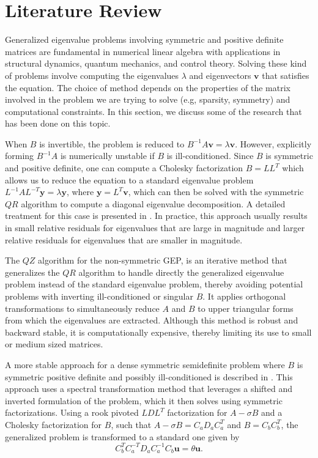\section{Literature Review}\label{sec:LiteratureReview}
Generalized eigenvalue problems involving symmetric and positive definite matrices are fundamental in numerical linear algebra with applications in structural  dynamics, quantum mechanics, and control theory. Solving these kind of problems involve computing the eigenvalues $\lambda$ and eigenvectors $\mathbf{v}$ that satisfies the equation. The choice of method depends on the properties of the matrix involved in the problem we are trying to solve (e.g, sparsity, symmetry) and computational constraints. In this section, we discuss some of the research that has been done on this topic.

When $B$ is invertible, the problem is reduced to $B^{-1}A\mathbf{v} = \lambda \mathbf{v}$. However, explicitly forming $B^{-1}A$ is numerically unstable if $B$ is ill-conditioned. Since $B$ is symmetric and positive definite, one can compute a Cholesky factorization $B = LL^{T}$ which allows us to reduce the equation to a standard eigenvalue problem $L^{-1}AL^{-T}\mathbf{y} = \lambda \mathbf{y}$, where $\mathbf{y}= L^T \mathbf{v}$, which can then be solved with the symmetric $QR$ algorithm to compute a diagonal eigenvalue decomposition. A detailed treatment for this case is presented in \cite{doi:10.1137/1.9781421407944}. In practice, this approach usually results in small relative residuals for eigenvalues that are large in magnitude and larger relative residuals for eigenvalues that are smaller in magnitude.

The $QZ$ algorithm \cite{5b3d5fb1-4813-3046-9331-a730b392f611} for the non-symmetric GEP, is an iterative method that generalizes the $QR$ algorithm to handle directly the generalized eigenvalue problem instead of the standard eigenvalue problem, thereby avoiding potential problems with inverting ill-conditioned or singular $B$. It applies orthogonal transformations to simultaneously reduce $A$ and $B$ to upper triangular forms from which the eigenvalues are extracted. Although this method is robust and backward stable, it is computationally expensive, thereby limiting its use to small or medium sized matrices.

A more stable approach for a dense symmetric semidefinite problem where $B$ is symmetric positive definite and possibly ill-conditioned is described in \cite{stewart2024spectraltransformationdensesymmetric}. This approach uses a spectral transformation method that leverages a shifted and inverted formulation of the problem, which it then solves using symmetric factorizations. Using a rook pivoted $LDL^T$ factorization for $A-\sigma B$ and a Cholesky factorization for $B$, such that $A-\sigma B = C_aD_aC_a^T$ and $B = C_bC_b^T$, the generalized problem is transformed to a standard one given by
\begin{equation}\label{eq:SpectralTrans_With_LDL}
	C_b^TC_a^{-T}D_aC_a^{-1}C_b \mathbf{u} = \theta \mathbf{u}.
\end{equation}

